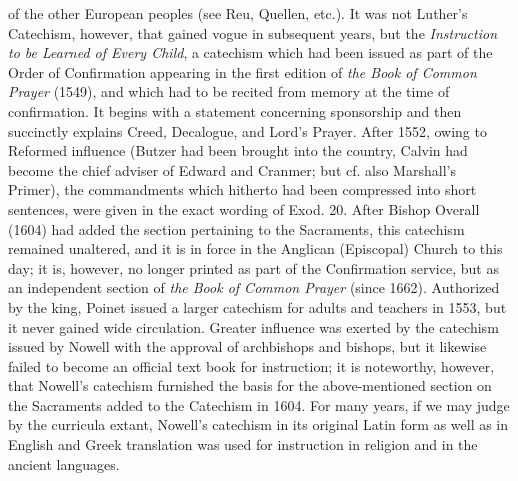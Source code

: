 of the other European peoples (see Reu, Quellen, etc.). It was not Luther’s Catechism, however, that gained vogue in subsequent years, but the \emph{Instruction to be Learned of Every Child}, a catechism which had been issued as part of the Order of Confirmation appearing in the first edition of \emph{the Book of Common Prayer} (1549), and which had to be recited from memory at the time of confirmation. It begins with a statement concerning sponsorship and then succinctly explains Creed, Decalogue, and Lord’s Prayer. After 1552, owing to Reformed influence (Butzer had been brought into the country, Calvin had become the chief adviser of Edward and Cranmer; but cf. also Marshall’s Primer), the commandments which hitherto had been compressed into short sentences, were given in the exact wording of Exod. 20. After Bishop Overall (1604) had added the section pertaining to the Sacraments, this catechism remained unaltered, and it is in force in the Anglican (Episcopal) Church to this day; it is, however, no longer printed as part of the Confirmation service, but as an independent section of \emph{the Book of Common Prayer} (since 1662). Authorized by the king, Poinet issued a larger catechism for adults and teachers in 1553, but it never gained wide circulation. Greater influence was exerted by the catechism issued by Nowell with the approval of archbishops and bishops, but it likewise failed to become an official text book for instruction; it is noteworthy, however, that Nowell’s catechism furnished the basis for the above-mentioned section on the Sacraments added to the Catechism in 1604. For many years, if we may judge by the curricula extant, Nowell’s catechism in its original Latin form as well as in English and Greek translation was used for instruction in religion and in the ancient languages.

